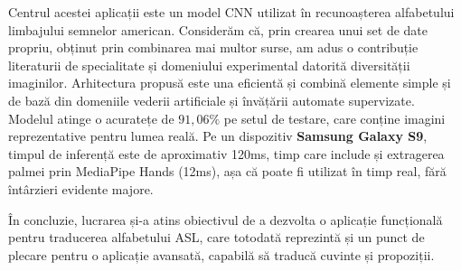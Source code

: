 Centrul acestei aplicații este un model CNN utilizat în recunoașterea alfabetului limbajului semnelor american. Considerăm că, prin crearea unui set de date propriu, obținut prin combinarea mai multor surse, am adus o contribuție literaturii de specialitate și domeniului experimental datorită diversității imaginilor. Arhitectura propusă este una eficientă și combină elemente simple și de bază din domeniile vederii artificiale și învățării automate supervizate. Modelul atinge o acuratețe de $91,06\%$ pe setul de testare, care conține imagini reprezentative pentru lumea reală. Pe un dispozitiv \textbf{Samsung Galaxy S9}, timpul de inferență este de aproximativ 120ms, timp care include și extragerea palmei prin MediaPipe Hands (12ms), așa că poate fi utilizat în timp real, fără întârzieri evidente majore.

În concluzie, lucrarea și-a atins obiectivul de a dezvolta o aplicație funcțională pentru traducerea alfabetului ASL, care totodată reprezintă și un punct de plecare pentru o aplicație avansată, capabilă să traducă cuvinte și propoziții.